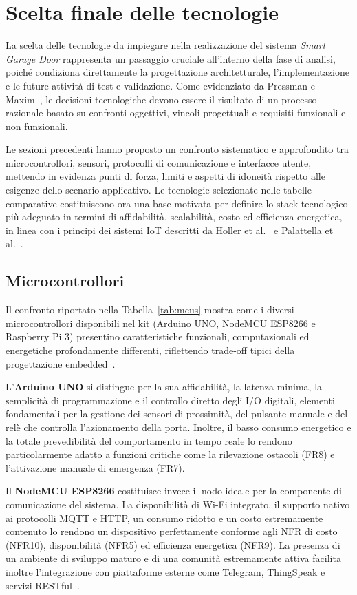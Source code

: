  \section{Scelta finale delle tecnologie} 
 La scelta delle tecnologie da impiegare nella realizzazione del sistema \textit{Smart Garage Door} rappresenta un passaggio cruciale all’interno della fase di analisi, poiché condiziona direttamente la progettazione architetturale, l’implementazione e le future attività di test e validazione. Come evidenziato da Pressman e Maxim~\cite{Pressman2019}, le decisioni tecnologiche devono essere il risultato di un processo razionale basato su confronti oggettivi, vincoli progettuali e requisiti funzionali e non funzionali. 
 
 Le sezioni precedenti hanno proposto un confronto sistematico e approfondito tra microcontrollori, sensori, protocolli di comunicazione e interfacce utente, mettendo in evidenza punti di forza, limiti e aspetti di idoneità rispetto alle esigenze dello scenario applicativo. Le tecnologie selezionate nelle tabelle comparative costituiscono ora una base motivata per definire lo stack tecnologico più adeguato in termini di affidabilità, scalabilità, costo ed efficienza energetica, in linea con i principi dei sistemi IoT descritti da Holler et al.~\cite{Holler2014} e Palattella et al.~\cite{Palattella2016}.
 
  \subsection{Microcontrollori} Il confronto riportato nella Tabella~\ref{tab:mcus} mostra come i diversi microcontrollori disponibili nel kit (Arduino UNO, NodeMCU ESP8266 e Raspberry Pi 3) presentino caratteristiche funzionali, computazionali ed energetiche profondamente differenti, riflettendo trade-off tipici della progettazione embedded~\cite{Piyare2013}. 
  
  L’\textbf{Arduino UNO} si distingue per la sua affidabilità, la latenza minima, la semplicità di programmazione e il controllo diretto degli I/O digitali, elementi fondamentali per la gestione dei sensori di prossimità, del pulsante manuale e del relè che controlla l’azionamento della porta. Inoltre, il basso consumo energetico e la totale prevedibilità del comportamento in tempo reale lo rendono particolarmente adatto a funzioni critiche come la rilevazione ostacoli (FR8) e l’attivazione manuale di emergenza (FR7). 
  
  Il \textbf{NodeMCU ESP8266} costituisce invece il nodo ideale per la componente di comunicazione del sistema. La disponibilità di Wi-Fi integrato, il supporto nativo ai protocolli MQTT e HTTP, un consumo ridotto e un costo estremamente contenuto lo rendono un dispositivo perfettamente conforme agli NFR di costo (NFR10), disponibilità (NFR5) ed efficienza energetica (NFR9). La presenza di un ambiente di sviluppo maturo e di una comunità estremamente attiva facilita inoltre l’integrazione con piattaforme esterne come Telegram, ThingSpeak e servizi RESTful~\cite{MQTTspec,ESP8266}. 
  
